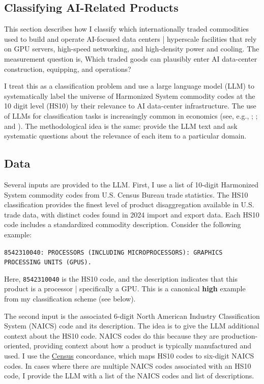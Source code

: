 \documentclass[12pt,pdftex]{article}
\newenvironment{prompt}{\par\medskip\noindent}{\par\medskip}
\begin{document}
\begin{onehalfspacing}
\section*{Classifying AI-Related Products}\label{sec:measurement}

This section describes how I classify which internationally traded commodities used to build and operate AI-focused data centers | hyperscale facilities that rely on GPU servers, high-speed networking, and high-density power and cooling. The measurement question is, Which traded goods can plausibly enter AI data-center construction, equipping, and operations?

I treat this as a classification problem and use a large language model (LLM) to systematically label the universe of Harmonized System commodity codes at the 10 digit level (HS10) by their relevance to AI data-center infrastructure. The use of LLMs for classification tasks is increasingly common in economics (see, e.g., \citealt{clayton2025geoeconomic}; \citealt{lagakos2025american}; and \citealt{cascaldi2026deregulation}). The methodological idea is the same: provide the LLM text and ask systematic questions about the relevance of each item to a particular domain.

\subsection*{Data}

Several inputs are provided to the LLM. First, I use a list of 10-digit Harmonized System commodity codes from U.S. Census Bureau trade statistics. The HS10 classification provides the finest level of product disaggregation available in U.S. trade data, with \totalTradeHsCodes{} distinct codes found in 2024 import and export data. Each HS10 code includes a standardized commodity description. Consider the following example:
\begin{prompt}
\noindent\texttt{8542310040: PROCESSORS (INCLUDING MICROPROCESSORS): GRAPHICS PROCESSING UNITS (GPUS).}
\end{prompt}
Here, \texttt{8542310040} is the HS10 code, and the description indicates that this product is a processor | specifically a GPU. This is a canonical \textbf{high} example from my classification scheme (see below). 

The second input is the associated 6-digit North American Industry Classification System (NAICS) code and its description. The idea is to give the LLM additional context about the HS10 code. NAICS codes do this because they are production-oriented, providing context about how a product is typically manufactured and used. I use the \href{https://www.census.gov/foreign-trade/schedules/b/2022/imp-code.txt}{Census} concordance, which maps HS10 codes to six-digit NAICS codes. In cases where there are multiple NAICS codes associated with an HS10 code, I provide the LLM with a list of the NAICS codes and list of descriptions. 


\end{onehalfspacing}
\end{document}
